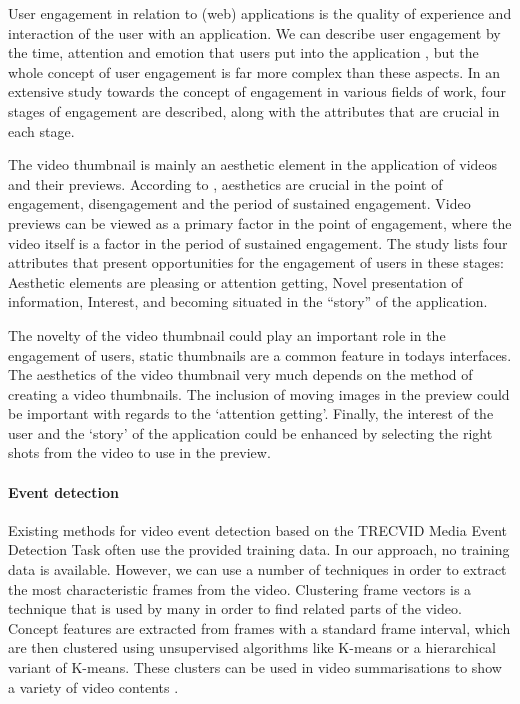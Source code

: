 \documentclass{../resources/sig-alternate-05-2015}
\begin{document}
User engagement in relation to (web) applications is the quality of experience and interaction of the user with an application. We can describe user engagement by the time, attention and emotion that users put into the application \cite{Lehmann:2012ia}, but the whole concept of user engagement is far more complex than these aspects. In an extensive study towards the concept of engagement in various fields of work, four stages of engagement are described, along with the attributes that are crucial in each stage.

The video thumbnail is mainly an aesthetic element in the application of videos and their previews. According to \textcite{OBrien:2008km}, aesthetics are crucial in the point of engagement, disengagement and the period of sustained engagement. Video previews can be viewed as a primary factor in the point of engagement, where the video itself is a factor in the period of sustained engagement. The study lists four attributes that present opportunities for the engagement of users in these stages: Aesthetic elements are pleasing or attention getting, Novel presentation of information, Interest, and becoming situated in the “story” of the application.

The novelty of the video thumbnail could play an important role in the engagement of users, static thumbnails are a common feature in todays interfaces. The aesthetics of the video thumbnail very much depends on the method of creating a video thumbnails. The inclusion of moving images in the preview could be important with regards to the `attention getting'. Finally, the interest of the user and the `story' of the application could be enhanced by selecting the right shots from the video to use in the preview.

\paragraph{Event detection}
Existing methods for video event detection based on the TRECVID Media Event Detection Task often use the provided training data. In our approach, no training data is available. However, we can use a number of techniques in order to extract the most characteristic frames from the video. Clustering frame vectors is a technique that is used by many in order to find related parts of the video. Concept features are extracted from frames with a standard frame interval, which are then clustered using unsupervised algorithms like K-means or a hierarchical variant of K-means. These clusters can be used in video summarisations to show a variety of video contents \cite{Mettes:2015vg,Ajmal:2012hi}.
\end{document}
